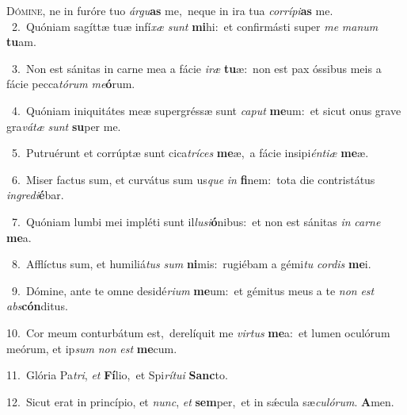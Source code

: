 \lettrine{\initial\textcolor{\initialcolor}{D}}{ómine,} ne in furóre tuo \textit{ár}\-\textit{gu}\textbf{as} me,~\star neque in ira tua \textit{cor}\-\textit{rí}\textit{pi}\textbf{as} me.\\
{\numbfont\textcolor{\numbcolor}{~2.}}~Quóniam sagíttæ tuæ infí\textit{xæ} \textit{sunt} \textbf{mi}\-hi:~\star et confirmásti super \textit{me} \textit{ma}\-\textit{num} \textbf{tu}\-am.\par
{\numbfont\textcolor{\numbcolor}{~3.}}~Non est sánitas in carne mea a fácie \textit{i}\-\textit{ræ} \textbf{tu}\-æ:~\star non est pax óssibus meis a fácie pecca\-\textit{tó}\-\textit{rum} \textit{me}\-\textbf{ó}rum.\par
{\numbfont\textcolor{\numbcolor}{~4.}}~Quóniam iniquitátes meæ supergréssæ sunt \textit{ca}\-\textit{put} \textbf{me}\-um:~\star et sicut onus grave gra\-\textit{vá}\-\textit{tæ} \textit{sunt} \textbf{su}\-per me.\par
{\numbfont\textcolor{\numbcolor}{~5.}}~Putruérunt et corrúptæ sunt cica\-\textit{trí}\-\textit{ces} \textbf{me}\-æ,~\star a fácie insipi\-\textit{én}\-\textit{ti}\textit{æ} \textbf{me}\-æ.\par
{\numbfont\textcolor{\numbcolor}{~6.}}~Miser factus sum, et curvátus sum us\textit{que} \textit{in} \textbf{fi}\-nem:~\star tota die contristátus \textit{in}\-\textit{gre}\textit{di}\textbf{é}bar.\par
{\numbfont\textcolor{\numbcolor}{~7.}}~Quóniam lumbi mei impléti sunt il\-\textit{lu}\-\textit{si}\textbf{ó}nibus:~\star et non est sánitas \textit{in} \textit{car}\-\textit{ne} \textbf{me}\-a.\par
{\numbfont\textcolor{\numbcolor}{~8.}}~Afflíctus sum, et humiliá\textit{tus} \textit{sum} \textbf{ni}\-mis:~\star rugiébam a gémi\textit{tu} \textit{cor}\-\textit{dis} \textbf{me}\-i.\par
{\numbfont\textcolor{\numbcolor}{~9.}}~Dómine, ante te omne desidé\-\textit{ri}\-\textit{um} \textbf{me}\-um:~\star et gémitus meus a te \textit{non} \textit{est} \textit{abs}\-\textbf{cón}ditus.\par
{\numbfont\textcolor{\numbcolor}{10.}}~Cor meum conturbátum est,~\dagger derelíquit me \textit{vir}\-\textit{tus} \textbf{me}\-a:~\star et lumen oculórum meórum, et ip\textit{sum} \textit{non} \textit{est} \textbf{me}\-cum.\par
{\numbfont\textcolor{\numbcolor}{11.}}~Glória Pa\-\textit{tri}\-, \textit{et} \textbf{Fí}\-lio,~\star et Spi\-\textit{rí}\-\textit{tu}\textit{i} \textbf{Sanc}\-to.\par
{\numbfont\textcolor{\numbcolor}{12.}}~Sicut erat in princípio, et \textit{nunc}\-, \textit{et} \textbf{sem}\-per,~\star et in sǽcula sæ\-\textit{cu}\-\textit{ló}\textit{rum}. \textbf{A}\-men.\par
